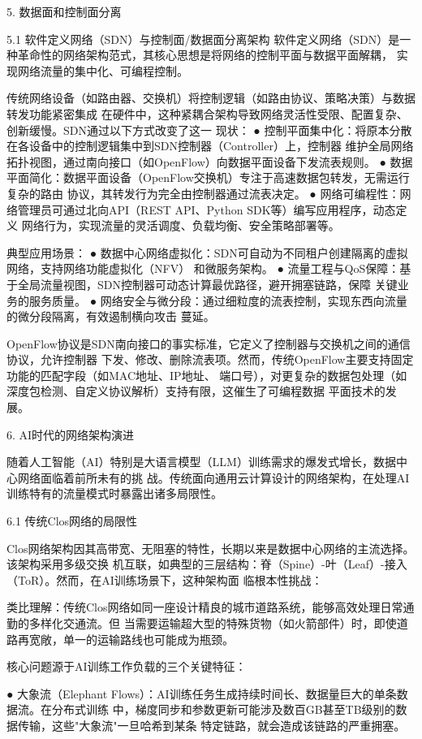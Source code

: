 5.   数据面和控制面分离

5.1  软件定义网络（SDN）与控制面/数据面分离架构
软件定义网络（SDN）是一种革命性的网络架构范式，其核心思想是将网络的控制平面与数据平面解耦，
实现网络流量的集中化、可编程控制。

传统网络设备（如路由器、交换机）将控制逻辑（如路由协议、策略决策）与数据转发功能紧密集成
在硬件中，这种紧耦合架构导致网络灵活性受限、配置复杂、创新缓慢。SDN通过以下方式改变了这一
现状：
● 控制平面集中化：将原本分散在各设备中的控制逻辑集中到SDN控制器（Controller）上，控制器
  维护全局网络拓扑视图，通过南向接口（如OpenFlow）向数据平面设备下发流表规则。
● 数据平面简化：数据平面设备（OpenFlow交换机）专注于高速数据包转发，无需运行复杂的路由
  协议，其转发行为完全由控制器通过流表决定。
● 网络可编程性：网络管理员可通过北向API（REST API、Python SDK等）编写应用程序，动态定义
  网络行为，实现流量的灵活调度、负载均衡、安全策略部署等。

典型应用场景：
● 数据中心网络虚拟化：SDN可自动为不同租户创建隔离的虚拟网络，支持网络功能虚拟化（NFV）
  和微服务架构。
● 流量工程与QoS保障：基于全局流量视图，SDN控制器可动态计算最优路径，避开拥塞链路，保障
  关键业务的服务质量。
● 网络安全与微分段：通过细粒度的流表控制，实现东西向流量的微分段隔离，有效遏制横向攻击
  蔓延。

OpenFlow协议是SDN南向接口的事实标准，它定义了控制器与交换机之间的通信协议，允许控制器
下发、修改、删除流表项。然而，传统OpenFlow主要支持固定功能的匹配字段（如MAC地址、IP地址、
端口号），对更复杂的数据包处理（如深度包检测、自定义协议解析）支持有限，这催生了可编程数据
平面技术的发展。


6.  AI时代的网络架构演进

随着人工智能（AI）特别是大语言模型（LLM）训练需求的爆发式增长，数据中心网络面临着前所未有的挑
战。传统面向通用云计算设计的网络架构，在处理AI训练特有的流量模式时暴露出诸多局限性。

6.1  传统Clos网络的局限性

Clos网络架构因其高带宽、无阻塞的特性，长期以来是数据中心网络的主流选择。该架构采用多级交换
机互联，如典型的三层结构：脊（Spine）-叶（Leaf）-接入（ToR）。然而，在AI训练场景下，这种架构面
临根本性挑战：

类比理解：传统Clos网络如同一座设计精良的城市道路系统，能够高效处理日常通勤的多样化交通流。但
当需要运输超大型的特殊货物（如火箭部件）时，即使道路再宽敞，单一的运输路线也可能成为瓶颈。

核心问题源于AI训练工作负载的三个关键特征：

● 大象流（Elephant Flows）：AI训练任务生成持续时间长、数据量巨大的单条数据流。在分布式训练
  中，梯度同步和参数更新可能涉及数百GB甚至TB级别的数据传输，这些"大象流"一旦哈希到某条
  特定链路，就会造成该链路的严重拥塞。
  

